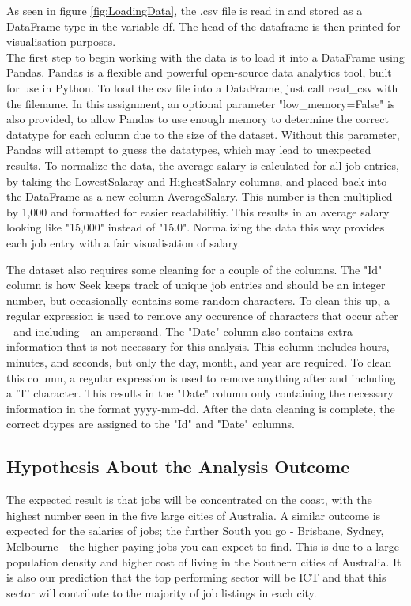 \documentclass[twoside, 12pt, a4paper]{article}
\begin{document}
As seen in figure \ref{fig:LoadingData}, the .csv file is read in and stored as a DataFrame type in the variable df. The head of the dataframe is then printed for visualisation purposes.\\
The first step to begin working with the data is to load it into a DataFrame using Pandas. Pandas is a flexible and powerful open-source data analytics tool, built for use in Python. To load the csv file into a DataFrame, just call read\_csv with the filename. In this assignment, an optional parameter "low\_memory=False" is also provided, to allow Pandas to use enough memory to determine the correct datatype for each column due to the size of the dataset. Without this parameter, Pandas will attempt to guess the datatypes, which may lead to unexpected results. To normalize the data, the average salary is calculated for all job entries, by taking the LowestSalaray and HighestSalary columns, and placed back into the DataFrame as a new column AverageSalary. This number is then multiplied by 1,000 and formatted for easier readabilitiy. This results in an average salary looking like "15,000" instead of "15.0". Normalizing the data this way provides each job entry with a fair visualisation of salary.

The dataset also requires some cleaning for a couple of the columns. The "Id" column is how Seek keeps track of unique job entries and should be an integer number, but occasionally contains some random characters. To clean this up, a regular expression is used to remove any occurence of characters that occur after - and including - an ampersand. The "Date" column also contains extra information that is not necessary for this analysis. This column includes hours, minutes, and seconds, but only the day, month, and year are required. To clean this column, a regular expression is used to remove anything after and including a 'T' character. This results in the "Date" column only containing the necessary information in the format yyyy-mm-dd. After the data cleaning is complete, the correct dtypes are assigned to the "Id" and "Date" columns.

\subsection{Hypothesis About the Analysis Outcome}

The expected result is that jobs will be concentrated on the coast, with the highest number seen in the five large cities of Australia. A similar outcome is expected for the salaries of jobs; the further South you go - Brisbane, Sydney, Melbourne - the higher paying jobs you can expect to find. This is due to a large population density and higher cost of living in the Southern cities of Australia. It is also our prediction that the top performing sector will be ICT and that this sector will contribute to the majority of job listings in each city. 
\end{document}
